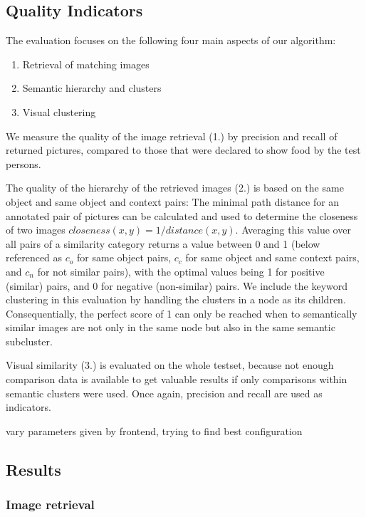 \subsection{Quality Indicators}
The evaluation focuses on the following four main aspects of our algorithm:
\begin{enumerate}
\item Retrieval of matching images
\item Semantic hierarchy and clusters
\item Visual clustering
\end{enumerate}

We measure the quality of the image retrieval (1.) by precision and recall of returned pictures, compared to those that were declared to show food by the test persons.  

The quality of the hierarchy of the retrieved images (2.) is based on the same object and same object and context pairs: The  minimal path distance for an annotated pair of pictures can be calculated and used to determine the closeness of two images $closeness(x,y) = 1/distance(x,y)$. Averaging this value over all pairs of a similarity category returns a value between 0 and 1 (below referenced as $c_o$ for same object pairs, $c_c$ for same object and same context pairs, and $c_n$ for not similar pairs), with the optimal values being 1 for positive (similar) pairs, and 0 for negative (non-similar) pairs. We include the keyword clustering in this evaluation by handling the clusters in a node as its children. Consequentially, the perfect score of 1 can only be reached when to semantically similar images are not only in the same node but also in the same semantic subcluster.

Visual similarity (3.) is evaluated on the whole testset, because not enough comparison data is available to get valuable results if only comparisons within semantic clusters were used. Once again, precision and recall are used as indicators.

vary parameters given by frontend, trying to find best configuration

\subsection{Results}
\label{sec_results}

\subsubsection*{Image retrieval}

